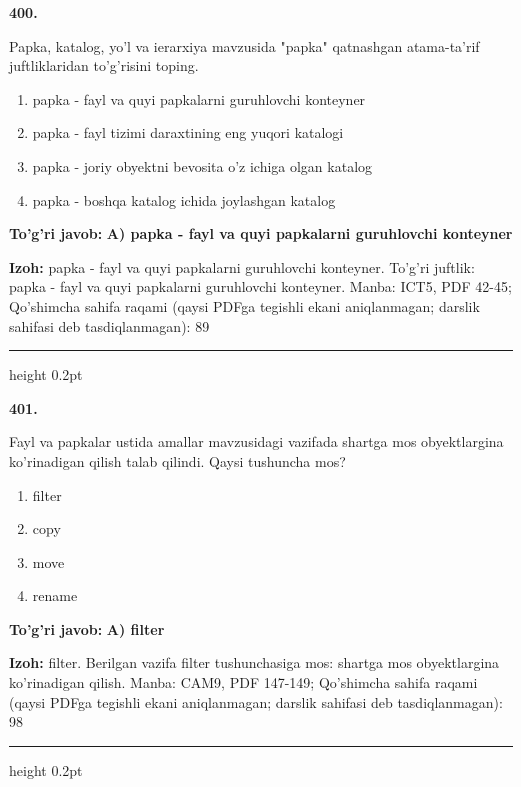 \documentclass[10pt,a4paper]{article}
\begin{document}
{\bfseries\sffamily\color{ink} 400.}
\par
Papka, katalog, yo'l va ierarxiya mavzusida "papka" qatnashgan atama-ta'rif juftliklaridan to'g'risini toping.
\begin{enumerate}[label=\Alph*),leftmargin=9mm]
\item papka - fayl va quyi papkalarni guruhlovchi konteyner
\item papka - fayl tizimi daraxtining eng yuqori katalogi
\item papka - joriy obyektni bevosita o'z ichiga olgan katalog
\item papka - boshqa katalog ichida joylashgan katalog
\end{enumerate}
\begin{tcolorbox}[enhanced,breakable,colback=teal!4,colframe=teal!60!black,boxrule=0.45pt,arc=1.2mm,left=2.7mm,right=2.7mm,top=1.8mm,bottom=1.8mm,before skip=2mm,after skip=2mm]
{\bfseries\sffamily\color{teal}To'g'ri javob:} \textbf{A) papka - fayl va quyi papkalarni guruhlovchi konteyner}
\par\smallskip
{\bfseries Izoh:} papka - fayl va quyi papkalarni guruhlovchi konteyner. To'g'ri juftlik: papka - fayl va quyi papkalarni guruhlovchi konteyner. Manba: ICT5, PDF 42-45; Qo'shimcha sahifa raqami (qaysi PDFga tegishli ekani aniqlanmagan; darslik sahifasi deb tasdiqlanmagan): 89
\end{tcolorbox}
\vspace{2mm}\hrule height 0.2pt\vspace{3mm}

{\bfseries\sffamily\color{ink} 401.}
\par
Fayl va papkalar ustida amallar mavzusidagi vazifada shartga mos obyektlargina ko'rinadigan qilish talab qilindi. Qaysi tushuncha mos?
\begin{enumerate}[label=\Alph*),leftmargin=9mm]
\item filter
\item copy
\item move
\item rename
\end{enumerate}
\begin{tcolorbox}[enhanced,breakable,colback=teal!4,colframe=teal!60!black,boxrule=0.45pt,arc=1.2mm,left=2.7mm,right=2.7mm,top=1.8mm,bottom=1.8mm,before skip=2mm,after skip=2mm]
{\bfseries\sffamily\color{teal}To'g'ri javob:} \textbf{A) filter}
\par\smallskip
{\bfseries Izoh:} filter. Berilgan vazifa filter tushunchasiga mos: shartga mos obyektlargina ko'rinadigan qilish. Manba: CAM9, PDF 147-149; Qo'shimcha sahifa raqami (qaysi PDFga tegishli ekani aniqlanmagan; darslik sahifasi deb tasdiqlanmagan): 98
\end{tcolorbox}
\vspace{2mm}\hrule height 0.2pt\vspace{3mm}
\end{document}
